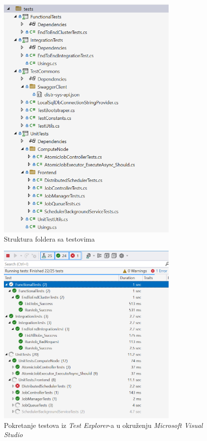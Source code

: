 \documentclass[12pt,oneside]{memoir}
\begin{document}
\begin{figure}[!ht]
  \centering
  \includegraphics[width=0.8\textwidth]{./images/testovi.png}
  \caption{Struktura foldera sa testovima}
  \label{fig:testovi}
\end{figure}

\begin{figure}[!ht]
  \centering
  \includegraphics[width=0.8\textwidth]{./images/testexplorer.png}
  \caption{Pokretanje testova iz \emph{Test Explorer}-a u okruženju \emph{Microsoft Visual Studio}}
  \label{fig:testexplorer}
\end{figure}
\end{document}
